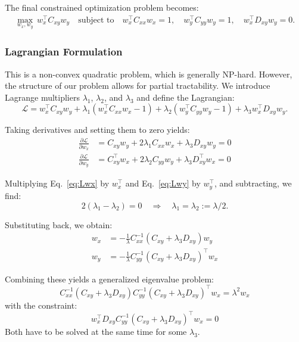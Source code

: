 \documentclass{article}
\begin{document}
The final constrained optimization problem becomes:
\begin{align}
\max_{w_x, w_y}\, w_x^\top C_{xy} w_y \label{optimize} \quad
\text{subject to} \quad w_x^\top C_{xx} w_x = 1, \quad w_y^\top C_{yy} w_y = 1, \quad w_x^\top D_{xy} w_y = 0. \nonumber
\end{align}

\subsubsection*{Lagrangian Formulation}

This is a non-convex quadratic problem, which is generally NP-hard. However, the structure of our problem allows for partial tractability. We introduce Lagrange multipliers $\lambda_1$, $\lambda_2$, and $\lambda_3$ and define the Lagrangian:
\[
\mathcal{L} = w_x^\top C_{xy} w_y + \lambda_1(w_x^\top C_{xx} w_x - 1) + \lambda_2(w_y^\top C_{yy} w_y - 1) + \lambda_3 w_x^\top D_{xy} w_y.
\]

Taking derivatives and setting them to zero yields:
\begin{align}
\frac{\partial \mathcal{L}}{\partial w_x} &= C_{xy} w_y + 2\lambda_1 C_{xx} w_x + \lambda_3 D_{xy} w_y = 0 \label{eq:Lwx} \\
\frac{\partial \mathcal{L}}{\partial w_y} &= C_{xy}^\top w_x + 2\lambda_2 C_{yy} w_y + \lambda_3 D_{xy}^\top w_x = 0 \label{eq:Lwy}
\end{align}

Multiplying Eq.~\eqref{eq:Lwx} by $w_x^\top$ and Eq.~\eqref{eq:Lwy} by $w_y^\top$, and subtracting, we find:
\[
2(\lambda_1 - \lambda_2) = 0 \quad \Rightarrow \quad \lambda_1 = \lambda_2 := \lambda/2.
\]

Substituting back, we obtain:
\begin{align}
w_x &= -\frac{1}{\lambda} C_{xx}^{-1}(C_{xy} + \lambda_3 D_{xy}) w_y \\
w_y &= -\frac{1}{\lambda} C_{yy}^{-1}(C_{xy} + \lambda_3 D_{xy})^\top w_x \label{gety}
\end{align}

Combining these yields a generalized eigenvalue problem:
\begin{equation}
C_{xx}^{-1}(C_{xy} + \lambda_3 D_{xy}) C_{yy}^{-1}(C_{xy} + \lambda_3 D_{xy})^\top w_x = \lambda^2 w_x \label{eq1}
\end{equation}
with the constraint:
\begin{equation}
w_x^\top D_{xy} C_{yy}^{-1}(C_{xy} + \lambda_3 D_{xy})^\top w_x = 0 \label{eq2}
\end{equation}
Both have to be solved at the same time for some $\lambda_3$.
\end{document}
